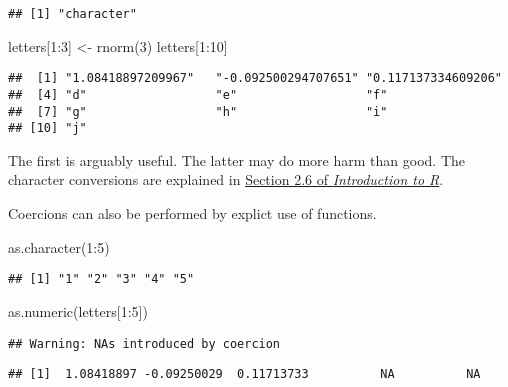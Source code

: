 \documentclass[
]{article}
\newenvironment{Shaded}{\begin{snugshade}}{\end{snugshade}}
\newcommand{\DecValTok}[1]{\textcolor[rgb]{0.00,0.00,0.81}{#1}}
\newcommand{\FunctionTok}[1]{\textcolor[rgb]{0.00,0.00,0.00}{#1}}
\newcommand{\NormalTok}[1]{#1}
\newcommand{\OtherTok}[1]{\textcolor[rgb]{0.56,0.35,0.01}{#1}}
\newcommand{\SpecialCharTok}[1]{\textcolor[rgb]{0.00,0.00,0.00}{#1}}
\begin{document}
\begin{verbatim}
## [1] "character"
\end{verbatim}

\begin{Shaded}
\begin{Highlighting}[]
\NormalTok{letters[}\DecValTok{1}\SpecialCharTok{:}\DecValTok{3}\NormalTok{] }\OtherTok{\textless{}{-}} \FunctionTok{rnorm}\NormalTok{(}\DecValTok{3}\NormalTok{)}
\NormalTok{letters[}\DecValTok{1}\SpecialCharTok{:}\DecValTok{10}\NormalTok{]}
\end{Highlighting}
\end{Shaded}

\begin{verbatim}
##  [1] "1.08418897209967"   "-0.092500294707651" "0.117137334609206" 
##  [4] "d"                  "e"                  "f"                 
##  [7] "g"                  "h"                  "i"                 
## [10] "j"
\end{verbatim}

The first is arguably useful. The latter may do more harm than good. The
character conversions are explained in
\href{https://cloud.r-project.org/doc/manuals/r-release/R-intro.html\#Character-vectors}{Section
2.6 of \emph{Introduction to R}}.

Coercions can also be performed by explict use of functions.

\begin{Shaded}
\begin{Highlighting}[]
\FunctionTok{as.character}\NormalTok{(}\DecValTok{1}\SpecialCharTok{:}\DecValTok{5}\NormalTok{)}
\end{Highlighting}
\end{Shaded}

\begin{verbatim}
## [1] "1" "2" "3" "4" "5"
\end{verbatim}

\begin{Shaded}
\begin{Highlighting}[]
\FunctionTok{as.numeric}\NormalTok{(letters[}\DecValTok{1}\SpecialCharTok{:}\DecValTok{5}\NormalTok{])}
\end{Highlighting}
\end{Shaded}

\begin{verbatim}
## Warning: NAs introduced by coercion
\end{verbatim}

\begin{verbatim}
## [1]  1.08418897 -0.09250029  0.11713733          NA          NA
\end{verbatim}
\end{document}
